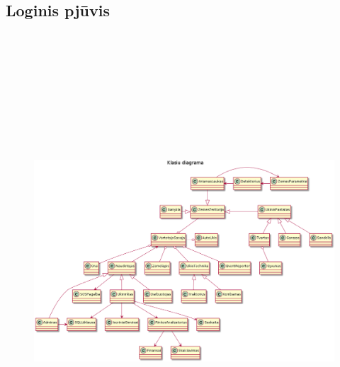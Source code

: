 \documentclass[oneside]{VUMIFPSkursinis}
\begin{document}
\subsection{Loginis pjūvis}
			\begin{figure}[H]
		\centering	
\includegraphics[width=18cm,height=17cm,keepaspectratio]{Klasesv2.png}
	\caption{}
	\label{fig:Klasesv2}
\end{figure}
	
\end{document}
